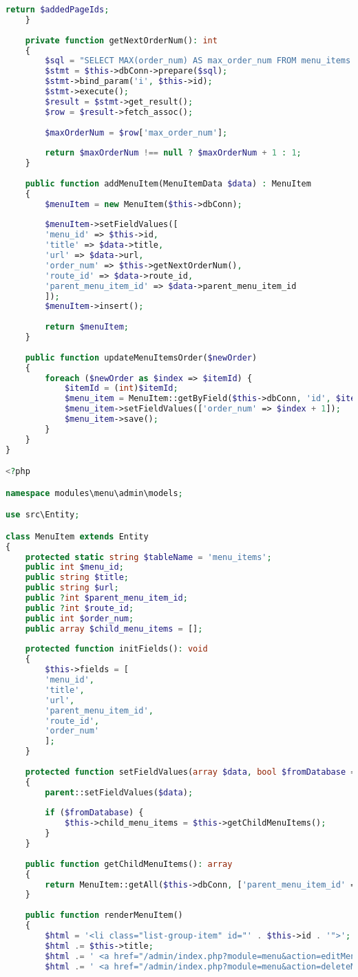 \begin{lstlisting}[language=PHP, frame=none]
		return $addedPageIds;
	}
	
	private function getNextOrderNum(): int
	{
		$sql = "SELECT MAX(order_num) AS max_order_num FROM menu_items WHERE menu_id=?";
		$stmt = $this->dbConn->prepare($sql);
		$stmt->bind_param('i', $this->id);
		$stmt->execute();
		$result = $stmt->get_result();
		$row = $result->fetch_assoc();
		
		$maxOrderNum = $row['max_order_num'];
		
		return $maxOrderNum !== null ? $maxOrderNum + 1 : 1;
	}
	
	public function addMenuItem(MenuItemData $data) : MenuItem
	{
		$menuItem = new MenuItem($this->dbConn);
		
		$menuItem->setFieldValues([
		'menu_id' => $this->id,
		'title' => $data->title,
		'url' => $data->url,
		'order_num' => $this->getNextOrderNum(),
		'route_id' => $data->route_id,
		'parent_menu_item_id' => $data->parent_menu_item_id
		]);
		$menuItem->insert();
		
		return $menuItem;
	}
	
	public function updateMenuItemsOrder($newOrder)
	{
		foreach ($newOrder as $index => $itemId) {
			$itemId = (int)$itemId;
			$menu_item = MenuItem::getByField($this->dbConn, 'id', $itemId);
			$menu_item->setFieldValues(['order_num' => $index + 1]);
			$menu_item->save();
		}
	}
}

<?php

namespace modules\menu\admin\models;

use src\Entity;

class MenuItem extends Entity
{
	protected static string $tableName = 'menu_items';
	public int $menu_id;
	public string $title;
	public string $url;
	public ?int $parent_menu_item_id;
	public ?int $route_id;
	public int $order_num;
	public array $child_menu_items = [];
	
	protected function initFields(): void
	{
		$this->fields = [
		'menu_id',
		'title',
		'url',
		'parent_menu_item_id',
		'route_id',
		'order_num'
		];
	}
	
	protected function setFieldValues(array $data, bool $fromDatabase = false): void
	{
		parent::setFieldValues($data);
		
		if ($fromDatabase) {
			$this->child_menu_items = $this->getChildMenuItems();
		}
	}
	
	public function getChildMenuItems(): array
	{
		return MenuItem::getAll($this->dbConn, ['parent_menu_item_id' => $this->id]);
	}
	
	public function renderMenuItem()
	{
		$html = '<li class="list-group-item" id="' . $this->id . '">';
		$html .= $this->title;
		$html .= ' <a href="/admin/index.php?module=menu&action=editMenuItem&id=' . $this->id . '">Изменить</a> ';
		$html .= ' <a href="/admin/index.php?module=menu&action=deleteMenuItem&id=' . $this->id . '">Удалить</a> ';
		

\end{lstlisting}
